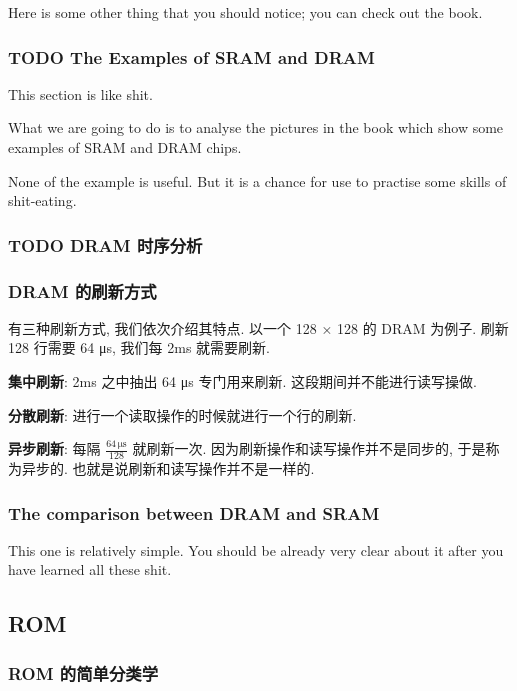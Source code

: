 \documentclass[11pt]{article}
\begin{document}
Here is some other thing that you should notice; you can check out the book.

\subsubsection{{\bfseries\sffamily TODO} The Examples of SRAM and DRAM}
\label{sec:org19b22a2}

This section is like shit. 

What we are going to do is to analyse the pictures in the book which show some examples of SRAM and DRAM chips. 

None of the example is useful. But it is a chance for use to practise some skills of shit-eating.
\subsubsection{{\bfseries\sffamily TODO} DRAM 时序分析}
\label{sec:org5b149a7}
\subsubsection{DRAM 的刷新方式}
\label{sec:orgbe0095d}

有三种刷新方式, 我们依次介绍其特点. 以一个 128 × 128 的 DRAM 为例子.
刷新 128 行需要 64 μs, 我们每 2ms 就需要刷新.

\textbf{集中刷新}: 2ms 之中抽出 64 μs 专门用来刷新. 这段期间并不能进行读写操做.

\textbf{分散刷新}: 进行一个读取操作的时候就进行一个行的刷新.

\textbf{异步刷新}: 每隔 \(\displaystyle \frac{64\, \mathrm{\mu s}}{128}\) 就刷新一次. 因为刷新操作和读写操作并不是同步的, 于是称为异步的. 也就是说刷新和读写操作并不是一样的. 

\subsubsection{The comparison between DRAM and SRAM}
\label{sec:org5fa92a7}

This one is relatively simple. You should be already very clear about it after you have learned all these shit.

\subsection{ROM}
\label{sec:orgdd76d7d}
\subsubsection{ROM 的简单分类学}
\label{sec:org7aff9a2}
\end{document}
